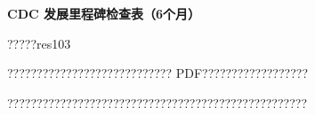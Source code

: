 \documentclass[11pt]{article}
\begin{document}
{\color[HTML]{0A84FF}\LARGE\bfseries CDC 发展里程碑检查表（6个月）\par}
{\color[HTML]{667085}\small ?????res103\par}
\vspace{1em}
???????????????????????????? PDF??????????????????

???????????????????????????????????????????????????
\end{document}
